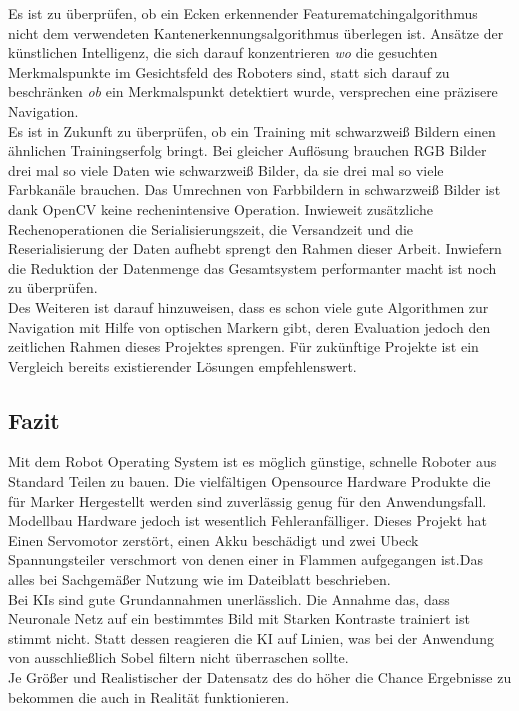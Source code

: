 \documentclass[conference]{IEEEtran}
\begin{document}
	Es ist zu überprüfen, ob ein Ecken erkennender Featurematchingalgorithmus nicht dem verwendeten Kantenerkennungsalgorithmus überlegen ist. Ansätze der künstlichen Intelligenz, die sich darauf konzentrieren \textit{wo} die gesuchten Merkmalspunkte im Gesichtsfeld des Roboters sind, statt sich darauf zu beschränken \textit{ob} ein Merkmalspunkt detektiert wurde, versprechen eine präzisere Navigation. \\
	Es ist in Zukunft zu überprüfen, ob ein Training mit schwarzweiß Bildern einen ähnlichen Trainingserfolg bringt. Bei gleicher Auflösung brauchen RGB Bilder drei mal so viele Daten wie schwarzweiß Bilder, da sie drei mal so viele Farbkanäle brauchen. Das Umrechnen von Farbbildern in schwarzweiß Bilder ist dank OpenCV keine rechenintensive Operation. Inwieweit zusätzliche Rechenoperationen die Serialisierungszeit, die Versandzeit und die Reserialisierung der Daten aufhebt sprengt den Rahmen dieser Arbeit. Inwiefern die Reduktion der Datenmenge das Gesamtsystem performanter macht ist noch zu überprüfen.
	\\
	Des Weiteren ist darauf hinzuweisen, dass es schon viele gute Algorithmen zur Navigation mit Hilfe von optischen Markern gibt, deren Evaluation jedoch den zeitlichen Rahmen dieses Projektes sprengen. Für zukünftige Projekte ist ein Vergleich bereits existierender Lösungen empfehlenswert.
		
	\subsection{Fazit}

Mit dem Robot Operating System ist es möglich günstige, schnelle Roboter 
aus Standard Teilen zu bauen. Die vielfältigen Opensource Hardware 
Produkte die für Marker Hergestellt werden sind zuverlässig genug für den 
Anwendungsfall. Modellbau Hardware jedoch ist wesentlich Fehleranfälliger. 
Dieses Projekt hat Einen Servomotor zerstört, einen Akku beschädigt und 
zwei Ubeck Spannungsteiler verschmort von denen einer in Flammen 
aufgegangen ist.Das alles bei Sachgemäßer Nutzung wie im  Dateiblatt 
beschrieben.\\

Bei KIs sind gute Grundannahmen unerlässlich. Die Annahme das, dass 
Neuronale Netz auf ein bestimmtes Bild mit  Starken Kontraste trainiert ist 
stimmt nicht. Statt dessen reagieren die KI auf Linien, was bei der 
Anwendung von ausschließlich Sobel filtern nicht überraschen sollte.
\\
Je Größer und Realistischer der Datensatz des do höher die Chance 
Ergebnisse zu bekommen die auch in Realität funktionieren.   \\
\end{document}
